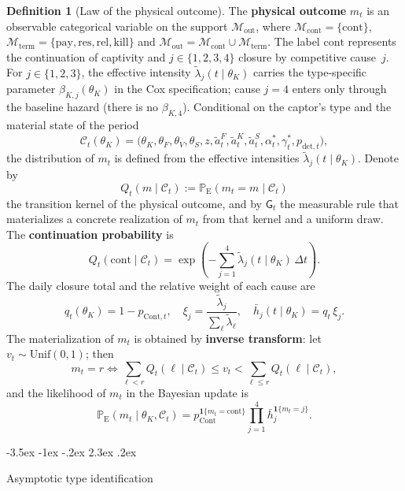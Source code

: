 \documentclass[12pt]{article}
\makeatletter
\numberwithin{equation}{section}
\numberwithin{table}{section}
\theoremstyle{definition}
\newtheorem{definition}[theorem]{Definition}
\newcommand{\ProbE}{\mathbb{P}_{\mathrm{E}}}
\newcommand{\Unif}{\mathrm{Unif}}
\renewcommand\section{\@startsection {section}{1}{\z@}%
                                   {-3.5ex \@plus -1ex \@minus -.2ex}%
                                   {2.3ex \@plus.2ex}%
                                   {\normalfont\Large\bfseries\raggedright}}
\makeatother
\begin{document}
\begin{definition}[Law of the physical outcome]
\label{def:desenlace-fisico-mt}
The \textbf{physical outcome} $m_t$ is an observable categorical variable on
the support $\mathcal{M}_{\mathrm{out}}$, where
$\mathcal{M}_{\mathrm{cont}}=\{\mathrm{cont}\}$,
$\mathcal{M}_{\mathrm{term}}=\{\mathrm{pay},\mathrm{res},\mathrm{rel},\mathrm{kill}\}$
and $\mathcal{M}_{\mathrm{out}}=\mathcal{M}_{\mathrm{cont}}\cup\mathcal{M}_{\mathrm{term}}$.
The label $\mathrm{cont}$ represents the continuation of captivity and
$j\in\{1,2,3,4\}$ closure by competitive cause~$j$. For $j\in\{1,2,3\}$, the
effective intensity $\tilde\lambda_j(t\mid\theta_K)$ carries the type-specific
parameter $\beta_{K,j}(\theta_K)$ in the Cox specification; cause $j=4$ enters
only through the baseline hazard (there is no $\beta_{K,4}$). Conditional on the
captor's type and the material state of the period
\[
\mathcal{C}_t(\theta_K)
=\bigl(\theta_K,\theta_F,\theta_V,\theta_S,z,
\tilde{a}_t^F,\tilde{a}_t^K,\tilde{a}_t^S,
\alpha_t^\ast,\gamma_t^\ast,p_{\mathrm{det},t}\bigr),
\]
the distribution of $m_t$ is defined from the effective intensities
$\tilde\lambda_j(t\mid\theta_K)$. Denote by
\[
Q_t(m\mid\mathcal C_t):=\ProbE(m_t=m\mid\mathcal C_t)
\]
the transition kernel of the physical outcome, and by $\mathsf{G}_t$ the
measurable rule that materializes a concrete realization of $m_t$ from that
kernel and a uniform draw. The \textbf{continuation probability} is
\[
Q_t(\mathrm{cont}\mid\mathcal{C}_t)
=\exp\!\left(-\sum_{j=1}^{4}\tilde\lambda_j(t\mid\theta_K)\,\Delta t\right).
\]
The daily closure total and the relative weight of each cause are
\[
q_t(\theta_K)=1-p_{\mathrm{Cont},t},\quad
\xi_j=\frac{\tilde\lambda_j}{\sum_\ell\tilde\lambda_\ell},\quad
\bar h_j(t\mid\theta_K)=q_t\,\xi_j.
\]
The materialization of $m_t$ is obtained by \textbf{inverse transform}:
let $v_t\sim\Unif(0,1)$; then
\[
m_t=r
\iff
\sum_{\ell<r}Q_t(\ell\mid\mathcal{C}_t)\le v_t
<\sum_{\ell\le r}Q_t(\ell\mid\mathcal{C}_t),
\]
and the likelihood of $m_t$ in the Bayesian update is
\[
\ProbE(m_t\mid\theta_K,\mathcal{C}_t)
=p_{\mathrm{Cont}}^{\mathbf{1}\{m_t=\mathrm{cont}\}}
\prod_{j=1}^{4}\bar h_j^{\mathbf{1}\{m_t=j\}}.
\]
\end{definition}

\section{Asymptotic type identification}
\label{sec:id-asintotica}
\end{document}
